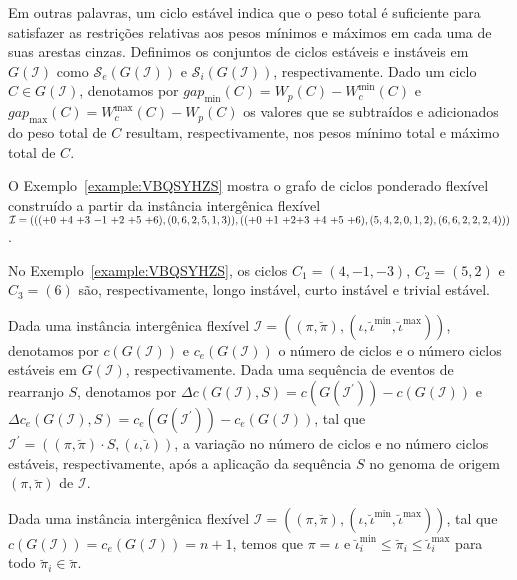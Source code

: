 Em outras palavras, um ciclo estável indica que o peso total é suficiente para satisfazer as restrições relativas aos pesos mínimos e máximos em cada uma de suas arestas cinzas. Definimos os conjuntos de ciclos estáveis e instáveis em $G(\mathcal{I})$ como $\mathcal{S}_e(G(\mathcal{I}))$ e $\mathcal{S}_i(G(\mathcal{I}))$, respectivamente. Dado um ciclo $C \in G(\mathcal{I})$, denotamos por $gap_{\min}(C) = W_p(C) - W^{\min}_c(C)$ e $gap_{\max}(C) = W^{\max}_c(C) - W_p(C)$ os valores que se subtraídos e adicionados do peso total de $C$ resultam, respectivamente, nos pesos mínimo total e máximo total de $C$.

O Exemplo~\ref{example:VBQSYHZS} mostra o grafo de ciclos ponderado flexível construído a partir da instância intergênica flexível $\mathcal{I} = ((({+0}~{+4}~{+3}~{-1}~{+2}~{+5}~{+6}),(0,6,2,5,1,3)),(({+0}~{+1}~{+2}\break{+3}~{+4}~{+5}~{+6}),(5,4,2,0,1,2),(6,6,2,2,2,4)))$.



No Exemplo~\ref{example:VBQSYHZS}, os ciclos $C_1=(4,-1,-3)$, $C_2 = (5,2)$ e $C_3 = (6)$ são, respectivamente, longo instável, curto instável e trivial estável.

Dada uma instância intergênica flexível $\mathcal{I} = ((\pi,\breve\pi),(\iota,\breve\iota^{\min},\breve\iota^{\max}))$, denotamos por $c(G(\mathcal{I}))$ e $c_e(G(\mathcal{I}))$ o número de ciclos e o número ciclos estáveis em $G(\mathcal{I})$, respectivamente. Dada uma sequência de eventos de rearranjo $S$, denotamos por $\Delta c(G(\mathcal{I}), S) = c(G(\mathcal{I^{\prime}})) - c(G(\mathcal{I}))$ e $\Delta c_e(G(\mathcal{I}), S) = c_e(G(\mathcal{I^{\prime}})) - c_e(G(\mathcal{I}))$, tal que $\mathcal{I^{\prime}} = ((\pi,\breve\pi) \cdot S,(\iota,\breve\iota))$, a variação no número de ciclos e no número ciclos estáveis, respectivamente, após a aplicação da sequência $S$ no genoma de origem $(\pi,\breve\pi)$ de $\mathcal{I}$.

\begin{remark}\label{remark:IRNWKUZA}
Dada uma instância intergênica flexível $\mathcal{I} = ((\pi,\breve\pi),(\iota,\breve\iota^{\min},\breve\iota^{\max}))$, tal que $c(G(\mathcal{I})) = c_e(G(\mathcal{I})) = n+1$, temos que $\pi = \iota$ e $\breve\iota^{\min}_i \le \breve\pi_i \le \breve\iota^{\max}_i$ para todo $\breve\pi_i \in \breve\pi$.
\end{remark}

